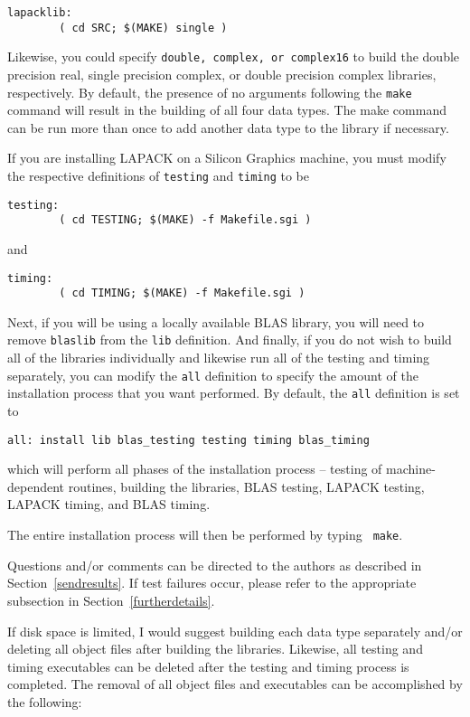 \begin{verbatim}
lapacklib:
        ( cd SRC; $(MAKE) single )
\end{verbatim}

Likewise, you could specify {\tt double, complex, or complex16} to
build the double precision real, single precision complex, or double
precision complex libraries, respectively.  By default, the presence of
no arguments following the {\tt make} command will result in the
building of all four data types.
The make command can be run more than once to add another
data type to the library if necessary.

If you are installing LAPACK on a Silicon Graphics machine, you must
modify the respective definitions of {\tt testing} and {\tt timing} to be
\begin{verbatim}
testing:
        ( cd TESTING; $(MAKE) -f Makefile.sgi )
\end{verbatim}
and
\begin{verbatim}
timing:
        ( cd TIMING; $(MAKE) -f Makefile.sgi )
\end{verbatim}
      
Next, if you will be using a locally available BLAS library, you will need
to remove {\tt blaslib} from the {\tt lib} definition.  And finally,
if you do not wish to build all of the libraries individually and
likewise run all of the testing and timing separately, you can
modify the {\tt all} definition to specify the amount of the
installation process that you want performed.  By default,
the {\tt all} definition is set to
\begin{verbatim}
all: install lib blas_testing testing timing blas_timing
\end{verbatim}
which will perform all phases of the installation
process -- testing of machine-dependent routines, building the libraries,
BLAS testing, LAPACK testing, LAPACK timing, and BLAS timing.

The entire installation process will then be performed by typing {\tt
make}.

Questions and/or comments can be directed to the
authors as described in Section~\ref{sendresults}.  If test failures
occur, please refer to the appropriate subsection in
Section~\ref{furtherdetails}.

If disk space is limited, I would suggest building each data type separately
and/or deleting all object files after building the libraries.  Likewise, all
testing and timing executables can be deleted after the testing and timing
process is completed.  The removal of all object files and executables
can be accomplished by the following:

